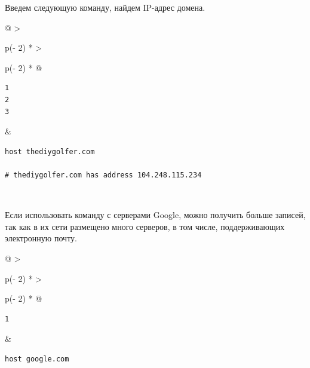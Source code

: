 \documentclass{article}
\begin{document}
Введем следующую команду, найдем IP-адрес домена.

\begin{longtable}[]{@{}
  >{\raggedright\arraybackslash}p{(\columnwidth - 2\tabcolsep) * }
  >{\raggedright\arraybackslash}p{(\columnwidth - 2\tabcolsep) * }@{}}
\toprule
\endhead
\begin{minipage}[t]{\linewidth}\raggedright
\begin{verbatim}
1
2
3
\end{verbatim}
\end{minipage} & \begin{minipage}[t]{\linewidth}\raggedright
\begin{verbatim}
host thediygolfer.com

# thediygolfer.com has address 104.248.115.234
\end{verbatim}
\end{minipage} \\ \addlinespace
\bottomrule
\end{longtable}

Если использовать команду с серверами Google, можно получить больше
записей, так как в их сети размещено много серверов, в том числе,
поддерживающих электронную почту.

\begin{longtable}[]{@{}
  >{\raggedright\arraybackslash}p{(\columnwidth - 2\tabcolsep) * }
  >{\raggedright\arraybackslash}p{(\columnwidth - 2\tabcolsep) * }@{}}
\toprule
\endhead
\begin{minipage}[t]{\linewidth}\raggedright
\begin{verbatim}
1
\end{verbatim}
\end{minipage} & \begin{minipage}[t]{\linewidth}\raggedright
\begin{verbatim}
host google.com
\end{verbatim}
\end{minipage} \\ \addlinespace
\bottomrule
\end{longtable}
\end{document}
